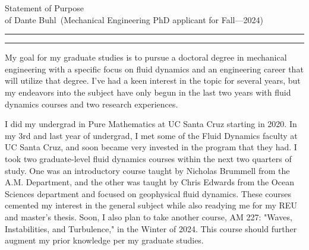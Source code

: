 \documentclass{article}
\newcommand{\soptitle}{Statement of Purpose}
\newcommand{\yourname}{Dante Buhl}
\begin{document}
\begin{center}\LARGE\soptitle\\
\large of \yourname\ (Mechanical Engineering PhD applicant for Fall---2024)
\end{center}

\hrule
\vspace{1pt}
\hrule height 1pt

\bigskip

\large
My goal for my graduate studies is to pursue a doctoral degree in mechanical engineering with a specific focus on fluid dynamics and an engineering career that will utilize that degree. I've had a keen interest in the topic for several years, but my endeavors into the subject have only begun in the last two years with fluid dynamics courses and two research experiences.

I did my undergrad in Pure Mathematics at UC Santa Cruz starting in 2020. In my 3rd and last year of undergrad, I met some of the Fluid Dynamics faculty at UC Santa Cruz, and soon became very invested in the program that they had. I took two graduate-level fluid dynamics courses within the next two quarters of study. One was an introductory course taught by Nicholas Brummell from the A.M. Department, and the other was taught by Chris Edwards from the Ocean Sciences department and focused on geophysical fluid dynamics. These courses cemented my interest in the general subject while also readying me for my REU and master's thesis. Soon, I also plan to take another course, AM 227: "Waves, Instabilities, and Turbulence," in the Winter of 2024. This course should further augment my prior knowledge per my graduate studies.
\end{document}
